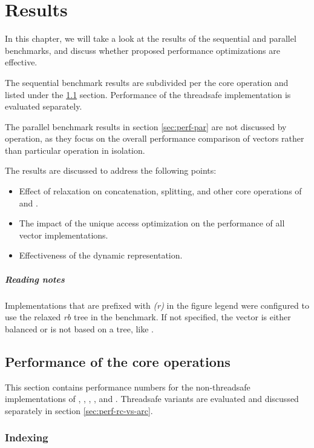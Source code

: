 \newcommand{\relaxed}{\emph{(r)}}

\chapter{Results}
In this chapter, we will take a look at the results of the sequential and parallel benchmarks, and discuss whether proposed performance optimizations are effective. 

The sequential benchmark results are subdivided per the core operation and listed under the \ref{sec:perf-seq} section. Performance of the threadsafe implementation is evaluated separately.  

The parallel benchmark results in section \ref{sec:perf-par} are not discussed by operation, as they focus on the overall performance comparison of vectors rather than particular operation in isolation. 

The results are discussed to address the following points:
\begin{itemize}
    \item Effect of \rrbtree{} relaxation on concatenation, splitting, and other core operations of \rrbvec{} and \pvec{}. 
    \item The impact of the unique access optimization on the performance of all vector implementations.
    \item Effectiveness of the dynamic representation.
\end{itemize}

\paragraph{Reading notes} 
Implementations that are prefixed with \relaxed{} in the figure legend were configured to use the relaxed \emph{rb} tree in the benchmark. If not specified, the vector is either balanced or is not based on a tree, like \stdvec{}. 

\section{Performance of the core operations}
\label{sec:perf-seq}
This section contains performance numbers for the non-threadsafe implementations of \stdvec{}, \rbvec{}, \rrbvec{}, \pvec{}, and \imrsvec{}. Threadsafe variants are evaluated and discussed separately in section \ref{sec:perf-rc-vs-arc}. 

\subsection{Indexing}

